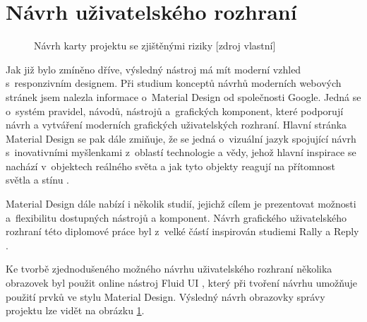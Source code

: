 \section{Návrh uživatelského rozhraní}

    \begin{figure}[!htbp]
    \begin{center}
    \caption{Návrh karty projektu se zjištěnými riziky [zdroj vlastní]}
    \label{guiProjekt}
    \end{center}
    \end{figure}

Jak již bylo zmíněno dříve, výsledný nástroj má mít moderní vzhled s~responzivním designem. Při studium konceptů návrhů moderních webových stránek jsem nalezla informace o~Material Design od společnosti Google. Jedná se o~systém pravidel, návodů, nástrojů a~grafických komponent, které podporují návrh a vytváření moderních grafických uživatelských rozhraní. Hlavní stránka Material Design se pak dále zmiňuje, že se jedná o~vizuální jazyk spojující návrh s~inovativními myšlenkami z~oblastí technologie a vědy, jehož hlavní inspirace se nachází v~objektech reálného světa a jak tyto objekty reagují na přítomnost světla a stínu \cite{MaterialDesign}.

Material Design dále nabízí i několik studií, jejichž cílem je prezentovat možnosti a~flexibilitu dostupných nástrojů a komponent. Návrh grafického uživatelského rozhraní této diplomové práce byl z~velké částí inspirován studiemi Rally \cite{Rally} a Reply \cite{Reply}.

Ke tvorbě zjednodušeného možného návrhu uživatelského rozhraní několika obrazovek byl použit online nástroj Fluid UI \cite{FluidUI}, který při tvoření návrhu umožňuje použití prvků ve stylu Material Design. Výsledný návrh obrazovky správy projektu lze vidět na obrázku \ref{guiProjekt}.

